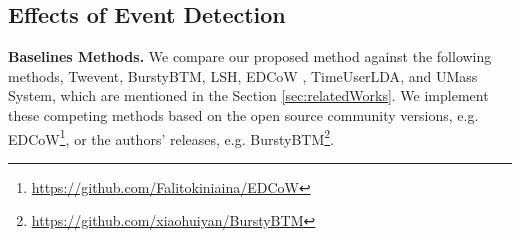 \documentclass{article}
\begin{document}

\subsection{Effects of Event Detection}
\textbf{Baselines Methods.} We compare our proposed method against the following methods, Twevent\cite{Twevent2012}, BurstyBTM\cite{Yan:2015wm}, LSH\cite{Petrovic:2010uj}, EDCoW \cite{Weng:2011wz}, TimeUserLDA\cite{Diao:2012wj}, and UMass System\cite{Allan:2000wu}, which are mentioned in the Section \ref{sec:relatedWorks}.
We implement these competing methods based on the open source community versions, e.g. EDCoW\footnote{\url{https://github.com/Falitokiniaina/EDCoW}}, or the authors' releases, e.g. BurstyBTM\footnote{\url{https://github.com/xiaohuiyan/BurstyBTM}}.
\end{document}
